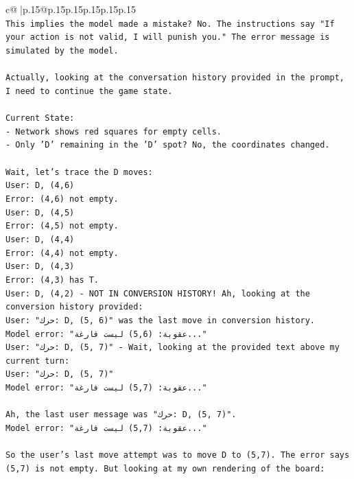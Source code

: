 \documentclass{article}
\begin{document}
{\begin{supertabular}{c@{$\;$}|p{.15\linewidth}@{}p{.15\linewidth}p{.15\linewidth}p{.15\linewidth}p{.15\linewidth}p{.15\linewidth}}
{{{\\ 
\texttt{This implies the model made a mistake? No. The instructions say "If your action is not valid, I will punish you." The error message is simulated by the model.} \\
\\ 
\texttt{Actually, looking at the conversation history provided in the prompt, I need to continue the game state.} \\
\\ 
\texttt{Current State:} \\
\texttt{{-} Network shows red squares for empty cells.} \\
\texttt{{-} Only 'D' remaining in the 'D' spot? No, the coordinates changed.} \\
\\ 
\texttt{Wait, let's trace the D moves:} \\
\texttt{User: D, (4,6)} \\
\texttt{Error: (4,6) not empty.} \\
\texttt{User: D, (4,5)} \\
\texttt{Error: (4,5) not empty.} \\
\texttt{User: D, (4,4)} \\
\texttt{Error: (4,4) not empty.} \\
\texttt{User: D, (4,3)} \\
\texttt{Error: (4,3) has T.} \\
\texttt{User: D, (4,2) {-} NOT IN CONVERSION HISTORY! Ah, looking at the conversion history provided:} \\
\texttt{User: "حرك: D, (5, 6)" was the last move in conversion history.} \\
\texttt{Model error: "عقوبة: (5,6) ليست فارغة..."} \\
\texttt{User: "حرك: D, (5, 7)" {-} Wait, looking at the provided text above my current turn:} \\
\texttt{User: "حرك: D, (5, 7)"} \\
\texttt{Model error: "عقوبة: (5,7) ليست فارغة..."} \\
\\ 
\texttt{Ah, the last user message was "حرك: D, (5, 7)".} \\
\texttt{Model error: "عقوبة: (5,7) ليست فارغة..."} \\
\\ 
\texttt{So the user's last move attempt was to move D to (5,7). The error says (5,7) is not empty. But looking at my own rendering of the board:} \\
}}}
\end{supertabular}}
\end{document}

